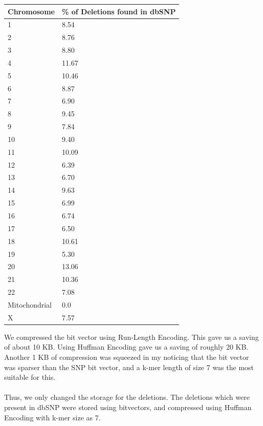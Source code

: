 \documentclass{article}
\begin{document}
\begin{center}
	\begin{tabular}{|p{1in}|p{1in}|}
	\hline
	Chromosome	&		\% of Deletions found in dbSNP \\
	\hline
	1	&		8.54 \\
	\hline
	2	&		8.76 \\
	\hline
	3	&		8.80 \\
	\hline
	4	&	11.67 \\
	\hline
	5	&	10.46 \\
	\hline
	6	&	8.87 \\
	\hline
	7	&	6.90 \\
	\hline
	8	&	9.45 \\
	\hline
	9	&	7.84 \\
	\hline
	10	&	9.40 \\
	\hline
	11	&	10.09 \\
	\hline
	12	&	6.39 \\
	\hline
	13	&	6.70 \\
	\hline
	14	&	9.63 \\
	\hline
	15	&	6.99 \\
	\hline
	16	&	6.74 \\	
	\hline
	17	&	6.50 \\
	\hline	
	18	&	10.61 \\
	\hline	
	19	&	5.30 \\
	\hline
	20	&	13.06 \\	
	\hline
	21	&	10.36 \\
	\hline
	22	&	7.08  \\
	\hline
	Mitochondrial	&	0.0 \\
	\hline
	X	&	7.57 \\
	\hline
	\end{tabular}

\end{center}























We compressed the bit vector using Run-Length Encoding. This gave us a saving of about 10 KB. Using Huffman Encoding gave us a saving of roughly 20 KB. Another 1 KB of compression was squeezed in my noticing that the bit vector was sparser than the SNP bit vector, and a k-mer length of size 7 was the most suitable for this.\\ 
\\
Thus, we only changed the storage for the deletions. The deletions which were present in dbSNP were stored using bitvectors, and compressed using Huffman Encoding with k-mer size as 7.
\clearpage
\end{document}
